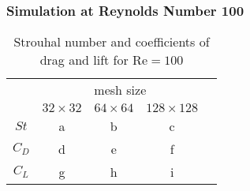 	\subsubsection{Simulation at Reynolds Number 100}
			\begin{table}[htp]
				\centering
				\begin{tabular}{|c||c|c|c|c}
					\cline{1-4}
					\rule{0pt}{2,3ex}\multirow{2}{*}{}   & \multicolumn{3}{c|}{mesh size} &  \\ \cline{2-4}
					\rule{0pt}{2,3ex}& $32 \times 32$       & $64 \times 64$       & $128 \times 128$      &  \\ \cline{1-4}
					\rule{0pt}{2,3ex}$St$ 				 & a        & b        & c        &  \\ \cline{1-4}
					\rule{0pt}{2,3ex}$C_D$                & d        & e        & f        &  \\ \cline{1-4}
					\rule{0pt}{2,3ex}$C_L$                & g        & h        & i        &  \\ \cline{1-4}
				\end{tabular}
				\caption{Strouhal number and coefficients of drag and lift for $\text{Re}=100$}
				\label{tab:re100}
			\end{table}
			
